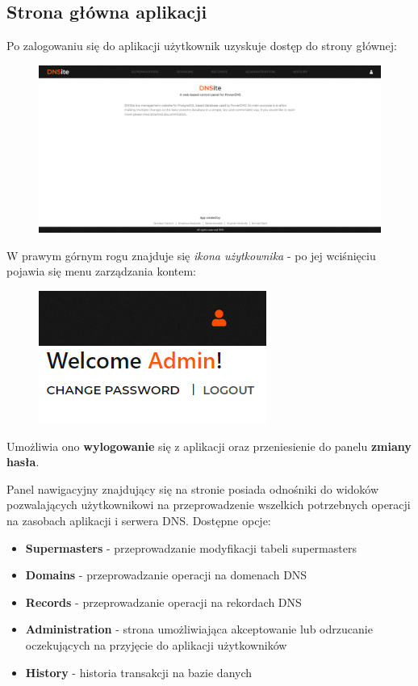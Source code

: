 \documentclass[12pt] {article}
\begin{document}
\subsection{Strona główna aplikacji}
Po zalogowaniu się do aplikacji użytkownik uzyskuje dostęp do strony głównej:
\begin{figure}[H]
\centering
\includegraphics[width=\textwidth]{res/8_strona_glowna}
\end{figure}
W prawym górnym rogu znajduje się \emph{ikona użytkownika} - po jej wciśnięciu pojawia się menu zarządzania kontem:
\begin{figure}[H]
\centering
\includegraphics[scale = 1]{res/9_panel_uzytkownika}
\end{figure}
Umożliwia ono \textbf{wylogowanie} się z aplikacji oraz przeniesienie do panelu \textbf{zmiany hasła}. 

Panel nawigacyjny znajdujący się na stronie posiada odnośniki do widoków pozwalających użytkownikowi na przeprowadzenie wszelkich potrzebnych operacji na zasobach aplikacji i serwera DNS. Dostępne opcje:
\begin{itemize}
\item \textbf{Supermasters} - przeprowadzanie modyfikacji tabeli supermasters
\item \textbf{Domains} - przeprowadzanie operacji na domenach DNS
\item \textbf{Records} - przeprowadzanie operacji na rekordach DNS
\item \textbf{Administration} - strona umożliwiająca akceptowanie lub odrzucanie oczekujących na przyjęcie do aplikacji użytkowników
\item \textbf{History} - historia transakcji na bazie danych
\end{itemize}
\end{document}
